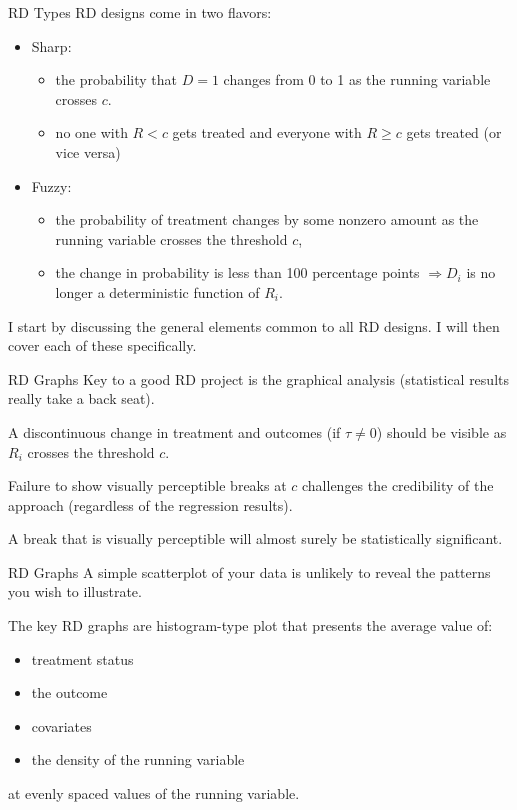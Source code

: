 \documentclass[
  ignorenonframetext,
]{beamer}
\providecommand{\tightlist}{%
  \setlength{\itemsep}{0pt}\setlength{\parskip}{0pt}}
\begin{document}
\begin{frame}{RD Types}
\protect\hypertarget{rd-types}{}
RD designs come in two flavors:

\begin{itemize}
\tightlist
\item
  Sharp:

  \begin{itemize}
  \tightlist
  \item
    the probability that \(D=1\) changes from 0 to 1 as the running
    variable crosses \(c\).
  \item
    no one with \(R<c\) gets treated and everyone with \(R\geq c\) gets
    treated (or vice versa)
  \end{itemize}
\item
  Fuzzy:

  \begin{itemize}
  \tightlist
  \item
    the probability of treatment changes by some nonzero amount as the
    running variable crosses the threshold \(c\),
  \item
    the change in probability is less than 100 percentage points
    \(\Rightarrow D_i\) is no longer a deterministic function of
    \(R_i\).
  \end{itemize}
\end{itemize}

I start by discussing the general elements common to all RD designs. I
will then cover each of these specifically.
\end{frame}

\begin{frame}{RD Graphs}
\protect\hypertarget{rd-graphs}{}
Key to a good RD project is the graphical analysis (statistical results
really take a back seat).

A discontinuous change in treatment and outcomes (if \(\tau\neq 0\))
should be visible as \(R_i\) crosses the threshold \(c\).

Failure to show visually perceptible breaks at \(c\) challenges the
credibility of the approach (regardless of the regression results).

A break that is visually perceptible will almost surely be statistically
significant.
\end{frame}

\begin{frame}{RD Graphs}
\protect\hypertarget{rd-graphs-1}{}
A simple scatterplot of your data is unlikely to reveal the patterns you
wish to illustrate.

The key RD graphs are histogram-type plot that presents the average
value of:

\begin{itemize}
\item
  treatment status
\item
  the outcome
\item
  covariates
\item
  the density of the running variable
\end{itemize}

at evenly spaced values of the running variable.
\end{frame}
\end{document}
